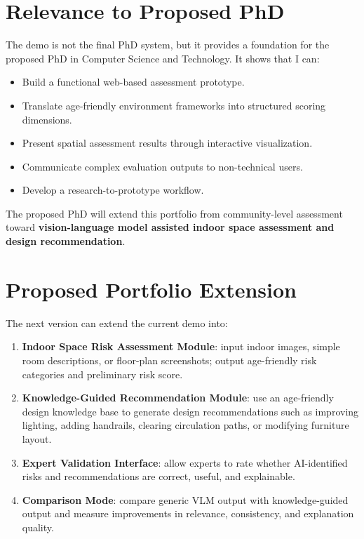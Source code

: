 \documentclass[11pt,a4paper]{article}
\begin{document}
\section*{Relevance to Proposed PhD}
The demo is not the final PhD system, but it provides a foundation for the proposed PhD in Computer Science and Technology. It shows that I can:

\begin{itemize}
  \item Build a functional web-based assessment prototype.
  \item Translate age-friendly environment frameworks into structured scoring dimensions.
  \item Present spatial assessment results through interactive visualization.
  \item Communicate complex evaluation outputs to non-technical users.
  \item Develop a research-to-prototype workflow.
\end{itemize}

The proposed PhD will extend this portfolio from community-level assessment toward \textbf{vision-language model assisted indoor space assessment and design recommendation}.

\section*{Proposed Portfolio Extension}
The next version can extend the current demo into:

\begin{enumerate}
  \item \textbf{Indoor Space Risk Assessment Module}: input indoor images, simple room descriptions, or floor-plan screenshots; output age-friendly risk categories and preliminary risk score.
  \item \textbf{Knowledge-Guided Recommendation Module}: use an age-friendly design knowledge base to generate design recommendations such as improving lighting, adding handrails, clearing circulation paths, or modifying furniture layout.
  \item \textbf{Expert Validation Interface}: allow experts to rate whether AI-identified risks and recommendations are correct, useful, and explainable.
  \item \textbf{Comparison Mode}: compare generic VLM output with knowledge-guided output and measure improvements in relevance, consistency, and explanation quality.
\end{enumerate}
\end{document}
